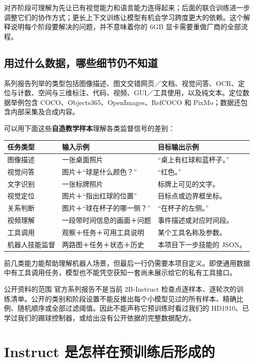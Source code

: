 对齐阶段可理解为先让已有视觉能力和语言能力连得起来；后面的联合训练进一步调整它们的协作方式；更长上下文训练让模型有机会学习跨度更大的依赖。这个解释说明每个阶段要解决的问题，并不意味着你的 6GB 显卡需要重做厂商的全部流程。

\subsection{用过什么数据，哪些细节仍不知道}

系列报告列举的类型包括图像描述、图文交错网页／文档、视觉问答、OCR、定位与计数、空间与三维标注、代码、视频、GUI／工具使用，以及纯文本。定位数据举例包含 COCO、Objects365、OpenImages、RefCOCO 和 PixMo；数据还包含内部采集及合成内容。\cite{qwen-report}

可以用下面这些\textbf{自造教学样本}理解各类监督信号的差别：

\begin{longtable}{P{3.0cm}P{6.0cm}P{5.3cm}}
\textbf{任务类型} & \textbf{输入示例} & \textbf{目标输出示例}\\
\hline
图像描述 & 一张桌面照片 & “桌上有红球和蓝杯子。”\\
视觉问答 & 图片＋“球是什么颜色？” & “红色。”\\
文字识别 & 一张标牌照片 & 标牌上可见的文字。\\
视觉定位 & 图片＋“指出红球的位置” & 目标点或边界框坐标。\\
关系判断 & 图片＋“球在杯子的哪一侧？” & “在杯子的左侧。”\\
视频理解 & 一段带时间信息的画面＋问题 & 事件描述或对应时间段。\\
工具调用 & 观察＋任务＋可用工具说明 & 某个工具名称及参数。\\
机器人技能监督 & 两路图＋任务＋状态＋历史 & 本项目下一步技能的 JSON。\\
\end{longtable}

前几类能力能帮助理解机器人场景，但最后一行仍需要本项目定义。即使通用数据中有工具调用任务，模型也不能凭空获知一套尚未展示给它的私有工具接口。

\begin{notebox}{公开资料的范围}
官方系列报告不是当前 2B-Instruct 检查点逐样本、逐轮次的训练清单。公开的类别和阶段设置不能反推出每个小模型见过的所有样本、精确比例、随机顺序或全部过滤阈值。因此不能声称它预训练时看过我们的 HD1910、已学过我们的踢球控制器，或给出没有公开依据的完整数据配方。
\end{notebox}

\section{Instruct 是怎样在预训练后形成的}

